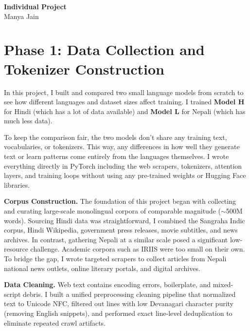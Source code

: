 \documentclass[11pt,a4paper]{article}
\begin{document}
\begin{center}
{\Large\bfseries Individual Project}\\[6pt]
{\normalsize Manya Jain }
\end{center}
\vspace{6pt}

\section{Phase 1: Data Collection and Tokenizer Construction}

In this project, I built and compared two small language models from scratch to see how different languages and dataset sizes affect training. I trained \textbf{Model H} for Hindi (which has a lot of data available) and \textbf{Model L} for Nepali (which has much less data).

To keep the comparison fair, the two models don't share any training text, vocabularies, or tokenizers. This way, any differences in how well they generate text or learn patterns come entirely from the languages themselves. I wrote everything directly in PyTorch including the web scrapers, tokenizers, attention layers, and training loops without using any pre-trained weights or Hugging Face libraries. 

\textbf{Corpus Construction.} The foundation of this project began with collecting and curating large-scale monolingual corpora of comparable magnitude ($\sim$500M words). Sourcing Hindi data was straightforward, I combined the Sangraha Indic corpus, Hindi Wikipedia, government press releases, movie subtitles, and news archives. In contrast, gathering Nepali at a similar scale posed a significant low-resource challenge. Academic corpora such as IRIIS were too small on their own. To bridge the gap, I wrote targeted scrapers to collect articles from Nepali national news outlets, online literary portals, and digital archives.

\textbf{Data Cleaning.} Web text contains encoding errors, boilerplate, and mixed-script debris. I built a unified preprocessing cleaning pipeline that normalized text to Unicode NFC, filtered out lines with low Devanagari character purity (removing English snippets), and performed exact line-level deduplication to eliminate repeated crawl artifacts. 
\end{document}
